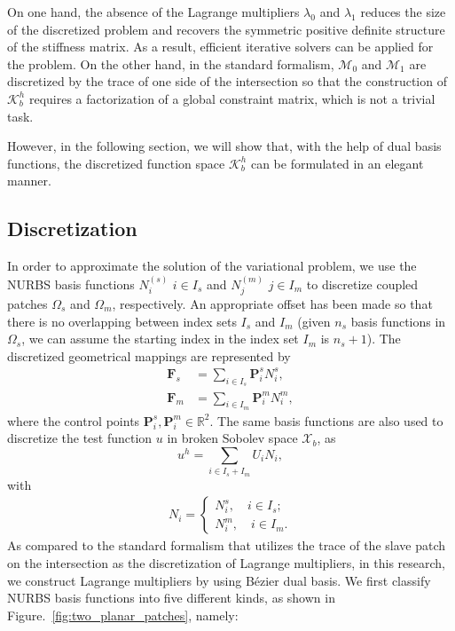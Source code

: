 \documentclass[preprint,12pt]{elsarticle}
\newcommand{\Bezier}{{B\'{e}zier} }
\begin{document}
On one hand, the absence of the Lagrange multipliers $\lambda_0$ and $\lambda_1$ reduces the size of the discretized problem and recovers the symmetric positive definite structure of the stiffness matrix. As a result, efficient iterative solvers can be applied for the problem. On the other hand, in the standard formalism, $\mathcal{M}_0$ and $\mathcal{M}_1$ are discretized by the trace of one side of the intersection so that the construction of $\mathcal{K}_b^h$ requires a factorization of a global constraint matrix, which is not a trivial task. \par
However, in the following section, we will show that, with the help of dual basis functions, the discretized function space $\mathcal{K}_b^h$ can be formulated in an elegant manner.
\subsection{Discretization}
In order to approximate the solution of the variational problem, we use the NURBS basis functions $N^{(s)}_i$ $i\in{I_s}$ and $N^{(m)}_j$ $j\in{I_m}$ to discretize coupled patches $\Omega_s$ and $\Omega_m$, respectively. An appropriate offset has been made so that there is no overlapping between index sets $I_s$ and $I_m$ (given $n_s$ basis functions in $\Omega_s$, we can assume the starting index in the index set $I_m$ is $n_s+1$). The discretized geometrical mappings are represented by
\begin{align}
    \mathbf{F}_s&=\sum_{i\in{I_s}}\mathbf{P}_i^sN_i^s,\\
    \mathbf{F}_m&=\sum_{i\in{I_m}}\mathbf{P}_i^mN_i^m,
\end{align}
where the control points $\mathbf{P}_i^s,\mathbf{P}_i^m\in\mathbb{R}^2$. The same basis functions are also used to discretize the test function $u$ in broken Sobolev space $\mathcal{X}_b$, as
\begin{equation}
    u^h=\sum_{i\in{I_s+I_m}}U_iN_i,
\end{equation}
with
\begin{align}
    N_i=
    \begin{cases}
        N_i^s, \quad i\in{I_s};\\
        N_i^m, \quad i\in{I_m}.
    \end{cases}
\end{align}
As compared to the standard formalism that utilizes the trace of the slave patch on the intersection as the discretization of Lagrange multipliers, in this research, we construct Lagrange multipliers by using \Bezier dual basis. We first classify NURBS basis functions into five different kinds, as shown in Figure.~\ref{fig:two_planar_patches}, namely:
\end{document}
